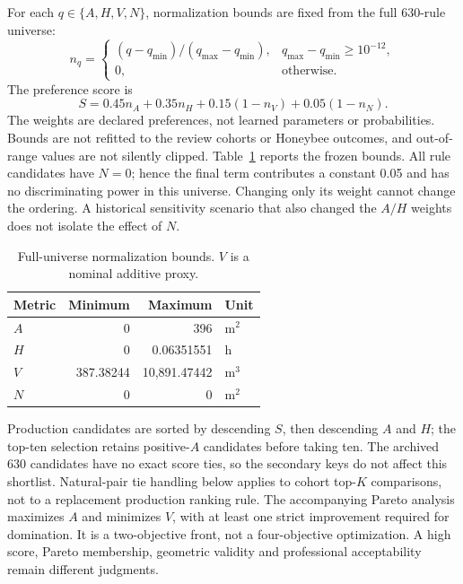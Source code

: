 \documentclass{llncs}
\begin{document}
For each $q\in\{A,H,V,N\}$, normalization bounds are fixed from the full 630-rule universe:
\begin{equation}
 n_q=\begin{cases}(q-q_{\min})/(q_{\max}-q_{\min}),&q_{\max}-q_{\min}\geq10^{-12},\\0,&\text{otherwise}.\end{cases}
 \label{eq:norm}
\end{equation}
The preference score is
\begin{equation}
 S=0.45n_A+0.35n_H+0.15(1-n_V)+0.05(1-n_N).
 \label{eq:score}
\end{equation}
The weights are declared preferences, not learned parameters or probabilities. Bounds are not refitted to the review cohorts or Honeybee outcomes, and out-of-range values are not silently clipped. Table~\ref{tab:bounds} reports the frozen bounds. All rule candidates have $N=0$; hence the final term contributes a constant 0.05 and has no discriminating power in this universe. Changing only its weight cannot change the ordering. A historical sensitivity scenario that also changed the $A/H$ weights does not isolate the effect of $N$.

\begin{table}[tbp]
\caption{Full-universe normalization bounds. $V$ is a nominal additive proxy.}
\label{tab:bounds}\centering
\begin{tabular}{lrrl}\toprule
Metric & Minimum & Maximum & Unit\\\midrule
$A$ & 0 & 396 & m$^2$\\
$H$ & 0 & 0.06351551 & h\\
$V$ & 387.38244 & 10,891.47442 & m$^3$\\
$N$ & 0 & 0 & m$^2$\\\bottomrule
\end{tabular}
\end{table}

Production candidates are sorted by descending $S$, then descending $A$ and $H$; the top-ten selection retains positive-$A$ candidates before taking ten. The archived 630 candidates have no exact score ties, so the secondary keys do not affect this shortlist. Natural-pair tie handling below applies to cohort top-$K$ comparisons, not to a replacement production ranking rule. The accompanying Pareto analysis maximizes $A$ and minimizes $V$, with at least one strict improvement required for domination. It is a two-objective front, not a four-objective optimization. A high score, Pareto membership, geometric validity and professional acceptability remain different judgments.
\end{document}
